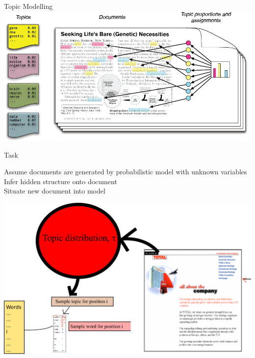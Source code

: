 \documentclass{lecture}
\begin{document}
\begin{plain}{Topic Modelling}
\includegraphics[scale=0.35]{figs/blei}
\end{plain}

\begin{plain}{Task}
\begin{itemize}
	\p Assume documents are generated by probabilistic model with unknown variables\\
	\p Infer hidden structure onto document\\
	\p Situate new document into model\\
\end{itemize}
\includegraphics[scale=0.4]{figs/steps}
\end{plain}
\end{document}
